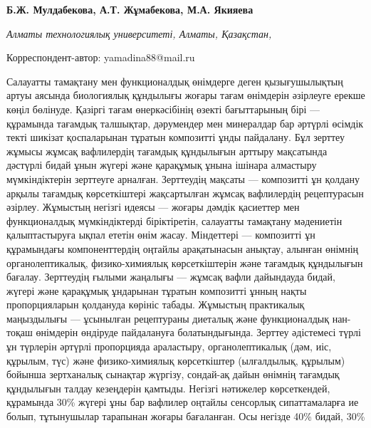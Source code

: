 
\begin{articleheader}

{\bfseries
Б.Ж. Мулдабекова,
А.Т. Жұмабекова,
М.А. Якияева\textsuperscript{\envelope }
}
\end{articleheader}

\begin{affiliation}
\emph{Алматы технологиялық университеті, Алматы, Қазақстан,}

\raggedright \textsuperscript{\envelope }Корреспондент-автор: yamadina88@mail.ru
\end{affiliation}

Салауатты тамақтану мен функционалдық өнімдерге деген қызығушылықтың
артуы аясында биологиялық құндылығы жоғары тағам өнімдерін әзірлеуге
ерекше көңіл бөлінуде. Қазіргі тағам өнеркәсібінің өзекті бағыттарының
бірі --- құрамында тағамдық талшықтар, дәрумендер мен минералдар бар
әртүрлі өсімдік текті шикізат қоспаларынан тұратын композитті ұнды
пайдалану. Бұл зерттеу жұмысы жұмсақ вафлилердің тағамдық құндылығын
арттыру мақсатында дәстүрлі бидай ұнын жүгері және қарақұмық ұнына
ішінара алмастыру мүмкіндіктерін зерттеуге арналған. Зерттеудің мақсаты
--- композитті ұн қолдану арқылы тағамдық көрсеткіштері жақсартылған
жұмсақ вафлилердің рецептурасын әзірлеу. Жұмыстың негізгі идеясы ---
жоғары дәмдік қасиеттер мен функционалдық мүмкіндіктерді біріктіретін,
салауатты тамақтану мәдениетін қалыптастыруға ықпал ететін өнім жасау.
Міндеттері --- композитті ұн құрамындағы компоненттердің оңтайлы
арақатынасын анықтау, алынған өнімнің органолептикалық, физико-химиялық
көрсеткіштерін және тағамдық құндылығын бағалау. Зерттеудің ғылыми
жаңалығы --- жұмсақ вафли дайындауда бидай, жүгері және қарақұмық
ұндарынан тұратын композитті ұнның нақты пропорцияларын қолдануда
көрініс табады. Жұмыстың практикалық маңыздылығы --- ұсынылған
рецептураны диеталық және функционалдық нан-тоқаш өнімдерін өндіруде
пайдалануға болатындығында. Зерттеу әдістемесі түрлі ұн түрлерін әртүрлі
пропорцияда араластыру, органолептикалық (дәм, иіс, құрылым, түс) және
физико-химиялық көрсеткіштер (ылғалдылық, құрылым) бойынша зертханалық
сынақтар жүргізу, сондай-ақ дайын өнімнің тағамдық құндылығын талдау
кезеңдерін қамтыды. Негізгі нәтижелер көрсеткендей, құрамында 30\%
жүгері ұны бар вафлилер оңтайлы сенсорлық сипаттамаларға ие болып,
тұтынушылар тарапынан жоғары бағаланған. Осы негізде 40\% бидай, 30\%
